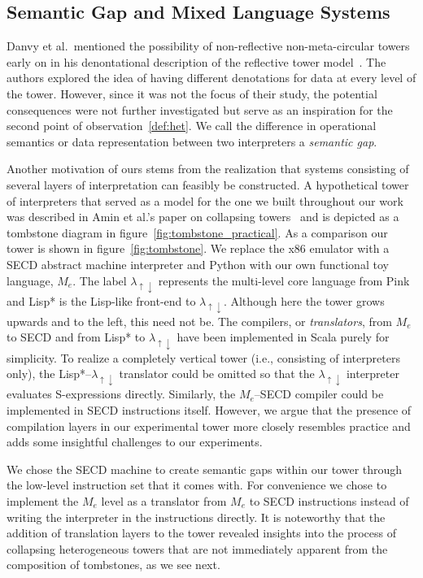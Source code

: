 \documentclass[sigplan,anonymous,review]{acmart}
\newcommand{\mslang}{$\lambda_{\uparrow\downarrow}$}
\newcommand{\mevl}{$M_{e}$}
\theoremstyle{definition}
\begin{document}
\subsection{Semantic Gap and Mixed Language Systems}
Danvy et al.~mentioned the possibility of non-reflective non-meta-circular towers early on in his denontational description of the reflective tower model~\cite{danvy1988intensions}. The authors explored the idea of having different denotations for data at every level of the tower. However, since it was not the focus of their study, the potential consequences were not further investigated but serve as an inspiration for the second point of observation~\ref{def:het}. We call the difference in operational semantics or data representation between two interpreters a \textit{semantic gap}.

Another motivation of ours stems from the realization that systems consisting of several layers of interpretation can feasibly be constructed. A hypothetical tower of interpreters that served as a model for the one we built throughout our work was described in Amin et al.'s paper on collapsing towers~\cite{amin2017collapsing} and is depicted as a tombstone diagram in figure~\ref{fig:tombstone_practical}. As a comparison our tower is shown in figure~\ref{fig:tombstone}. We replace the x86 emulator with a SECD abstract machine interpreter and Python with our own functional toy language, \mevl. The label \mslang{} represents the multi-level core language from Pink~\cite{amin2017collapsing} and Lisp* is the Lisp-like front-end to \mslang. Although here the tower grows upwards and to the left, this need not be. The compilers, or \textit{translators}, from \mevl{} to SECD and from Lisp* to \mslang{} have been implemented in Scala purely for simplicity. To realize a completely vertical tower (i.e., consisting of interpreters only), the Lisp*--\mslang{} translator could be omitted so that the \mslang{} interpreter evaluates S-expressions directly. Similarly, the \mevl--SECD compiler could be implemented in SECD instructions itself. However, we argue that the presence of compilation layers in our experimental tower more closely resembles practice and adds some insightful challenges to our experiments.

We chose the SECD machine to create semantic gaps within our tower through the low-level instruction set that it comes with. For convenience we chose to implement the \mevl{} level as a translator from \mevl{} to SECD instructions instead of writing the interpreter in the instructions directly.
It is noteworthy that the addition of translation layers to the tower revealed insights into the process of collapsing heterogeneous towers that are not immediately apparent from the composition of tombstones, as we see next.
\end{document}
